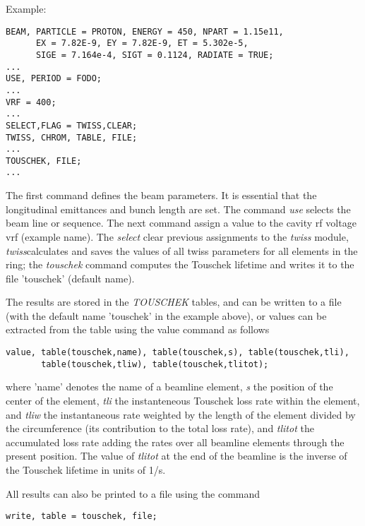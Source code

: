 Example: 
\begin{verbatim}
BEAM, PARTICLE = PROTON, ENERGY = 450, NPART = 1.15e11, 
      EX = 7.82E-9, EY = 7.82E-9, ET = 5.302e-5,
      SIGE = 7.164e-4, SIGT = 0.1124, RADIATE = TRUE;
...
USE, PERIOD = FODO;	
... 	
VRF = 400;
...
SELECT,FLAG = TWISS,CLEAR;
TWISS, CHROM, TABLE, FILE;
...
TOUSCHEK, FILE;
...
\end{verbatim}

The first command defines the beam parameters. It is essential that the
longitudinal emittances and bunch length are set. The command
\textit{use} selects the beam line or sequence. The next command assign
a value to the cavity rf voltage vrf  (example name). The
\textit{select} clear previous assignments to the \textit{twiss} module,
\textit{twiss}calculates and saves the values of all twiss parameters
for all elements in the ring; the \textit{touschek} command computes the
Touschek lifetime and writes it to the file 'touschek' (default name).   

The results are stored in the \textit{TOUSCHEK} tables, and can be written to a 
file (with the default name 'touschek' in the example above), or values can be 
extracted from the table using the value command as follows 

\begin{verbatim}
value, table(touschek,name), table(touschek,s), table(touschek,tli),
       table(touschek,tliw), table(touschek,tlitot); 
\end{verbatim}

where 'name' denotes the name of a beamline element, \textit{s} the
position of the center of the element,\textit{ tli} the instanteneous
Touschek loss rate within the element, and \textit{tliw} the
instantaneous rate weighted by the length of the element divided by the
circumference (its contribution to the total loss rate), and\textit{
tlitot }the accumulated loss rate adding the rates over all beamline
elements through the present position. The value of \textit{tlitot} at
the end of the beamline is the inverse of the Touschek lifetime in units
of 1/s. 

All results can also be printed to a file using the command 
\begin{verbatim}
write, table = touschek, file;
\end{verbatim}

